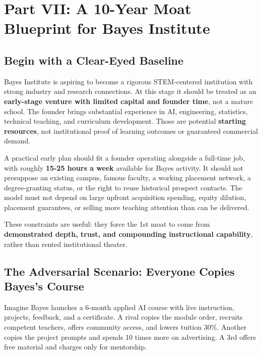 \section*{Part VII: A 10-Year Moat Blueprint for Bayes Institute}
\label{sec:part7_ten_year_moat_blueprint_bayes}

\subsection{Begin with a Clear-Eyed Baseline}
\label{sec:bayes_clear_eyed_baseline}

Bayes Institute is aspiring to become a rigorous STEM-centered institution with strong industry and research connections. At this stage it should be treated as an \textbf{early-stage venture with limited capital and founder time}, not a mature school. The founder brings substantial experience in AI, engineering, statistics, technical teaching, and curriculum development. Those are potential \textbf{starting resources}, not institutional proof of learning outcomes or guaranteed commercial demand.

A practical early plan should fit a founder operating alongside a full-time job, with roughly \textbf{15-25 hours a week} available for Bayes activity. It should not presuppose an existing campus, famous faculty, a working placement network, a degree-granting status, or the right to reuse historical prospect contacts. The model must not depend on large upfront acquisition spending, equity dilution, placement guarantees, or selling more teaching attention than can be delivered.

These constraints are useful: they force the 1st moat to come from \textbf{demonstrated depth, trust, and compounding instructional capability}, rather than rented institutional theater.

\subsection{The Adversarial Scenario: Everyone Copies Bayes's Course}
\label{sec:adversarial_scenario_everyone_copies}

Imagine Bayes launches a 6-month applied AI course with live instruction, projects, feedback, and a certificate. A rival copies the module order, recruits competent teachers, offers community access, and lowers tuition 30\%. Another copies the project prompts and spends 10 times more on advertising. A 3rd offers free material and charges only for mentorship.

